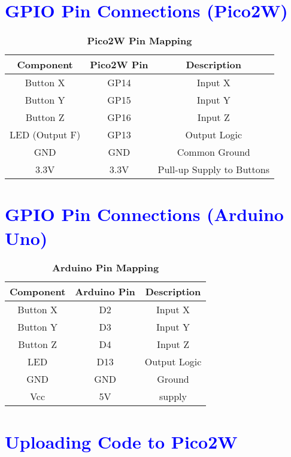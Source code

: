 \documentclass[twocolumn]{article}
\begin{document}
\section*{\textcolor{blue}{GPIO Pin Connections (Pico2W)}}
\begin{table}[H]
\centering
\renewcommand{\arraystretch}{1.3}
\begin{tabular}{|c|c|c|}
\hline
\textbf{Component} & \textbf{Pico2W Pin} & \textbf{Description} \\
\hline
Button X & GP14 & Input X \\
Button Y & GP15 & Input Y \\
Button Z & GP16 & Input Z \\
LED (Output F) & GP13 & Output Logic \\
GND & GND & Common Ground \\
3.3V & 3.3V & Pull-up Supply to Buttons \\
\hline
\end{tabular}
\caption*{\textbf{Pico2W Pin Mapping}}
\end{table}

\section*{\textcolor{blue}{GPIO Pin Connections (Arduino Uno)}}
\begin{table}[H]
\centering
\renewcommand{\arraystretch}{1.3}
\begin{tabular}{|c|c|c|}
\hline
\textbf{Component} & \textbf{Arduino Pin} & \textbf{Description} \\
\hline
Button X & D2 & Input X \\
Button Y & D3 & Input Y \\
Button Z & D4 & Input Z \\
LED & D13 & Output Logic \\
GND & GND &  Ground \\
Vcc & 5V & supply\\
\hline
\end{tabular}
\caption*{\textbf{Arduino Pin Mapping}}
\end{table}

\section*{\textcolor{blue}{Uploading Code to Pico2W }}
\end{document}
